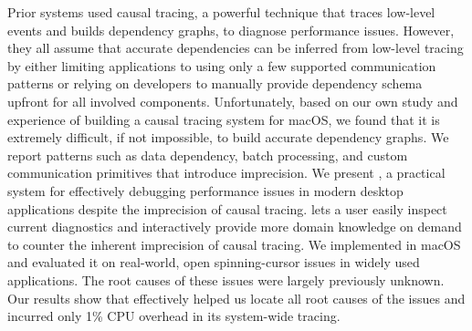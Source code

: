Prior systems used causal tracing, a powerful technique that traces low-level
events and builds dependency graphs, to diagnose performance issues.  However,
they all assume that accurate dependencies can be inferred from low-level
tracing by either limiting applications to using only a few supported
communication patterns or relying on developers to manually provide dependency
schema upfront for all involved components.  Unfortunately, based on our own
study and experience of building a causal tracing system for macOS, we found
that it is extremely difficult, if not impossible, to build accurate dependency
graphs.  We report patterns such as data dependency, batch processing, and
custom communication primitives that introduce imprecision.  We present \xxx, a
practical system for effectively debugging performance issues in modern desktop
applications despite the imprecision of causal tracing.  \xxx lets a user
easily inspect current diagnostics and interactively provide more domain
knowledge on demand to counter the inherent imprecision of causal tracing.  We
implemented \xxx in macOS and evaluated it on \nbug real-world, open
spinning-cursor issues in widely used applications.  The root causes of these
issues were largely previously unknown.  Our results show that \xxx effectively
helped us locate all root causes of the issues and incurred only 1\% CPU
overhead in its system-wide tracing.
